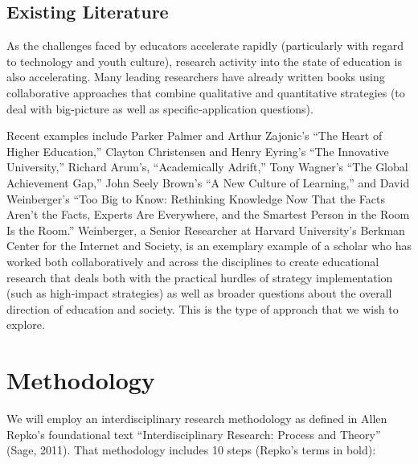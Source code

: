 \documentclass[letterpaper,10pt,headsepline]{scrreprt}
\begin{document}
\subsection{Existing Literature}

As the challenges faced by educators accelerate rapidly (particularly with
regard to technology and youth culture), research activity into the state of
education is also accelerating. Many leading researchers have already written
books using collaborative approaches that combine qualitative and quantitative
strategies (to deal with big-picture as well as specific-application
questions).

Recent examples include Parker Palmer and Arthur Zajonic's ``The Heart of
Higher Education,'' Clayton Christensen and Henry Eyring's ``The Innovative
University,'' Richard Arum's, ``Academically Adrift,'' Tony Wagner's ``The Global
Achievement Gap,'' John Seely Brown's ``A New Culture of Learning,'' and David
Weinberger's ``Too Big to Know: Rethinking Knowledge Now That the Facts Aren't
the Facts, Experts Are Everywhere, and the Smartest Person in the Room Is the
Room.'' Weinberger, a Senior Researcher at Harvard University's Berkman Center
for the Internet and Society, is an exemplary example of a scholar who has
worked both collaboratively and across the disciplines to create educational
research that deals both with the practical hurdles of strategy implementation
(such as high-impact strategies) as well as broader questions about the
overall direction of education and society. This is the type of approach that
we wish to explore.


\section{Methodology}

We will employ an interdisciplinary research methodology as defined in Allen
Repko's foundational text ``Interdisciplinary Research: Process and Theory''
(Sage, 2011). That methodology includes 10 steps (Repko's terms in bold):
\end{document}
